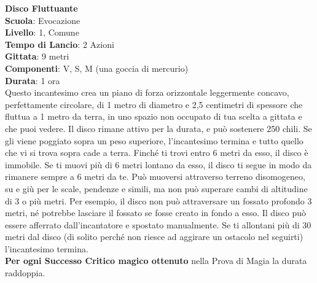 \begin{multicols}{2}
\medskip\textbf{Disco Fluttuante}\\
\textbf{Scuola}: Evocazione\\
\textbf{Livello}: 1, Comune\\
\textbf{Tempo di Lancio}: 2 Azioni\\
\textbf{Gittata}: 9 metri\\
\textbf{Componenti}: V, S, M (una goccia di mercurio)\\
\textbf{Durata}: 1 ora\\
Questo incantesimo crea un piano di forza orizzontale leggermente concavo, perfettamente circolare, di 1 metro di diametro e 2,5 centimetri di spessore che fluttua a 1 metro da terra, in uno spazio non occupato di tua scelta a gittata e che puoi vedere. Il disco rimane attivo per la durata, e può sostenere 250 chili. Se gli viene poggiato sopra un peso superiore, l'incantesimo termina e tutto quello che vi si trova sopra cade a terra. Finché ti trovi entro 6 metri da esso, il disco è immobile. Se ti muovi più di 6 metri lontano da esso, il disco ti segue in modo da rimanere sempre a 6 metri da te. Può muoversi attraverso terreno disomogeneo, su e giù per le scale, pendenze e simili, ma non può superare cambi di altitudine di 3 o più metri. Per esempio, il disco non può attraversare un fossato profondo 3 metri, né potrebbe lasciare il fossato se fosse creato in fondo a esso. Il disco può essere afferrato dall'incantatore e spostato manualmente. Se ti allontani più di 30 metri dal disco (di solito perché non riesce ad aggirare un ostacolo nel seguirti) l'incantesimo termina.\\
\textbf{Per ogni Successo Critico magico ottenuto} nella Prova di Magia la durata raddoppia.


\end{multicols}
